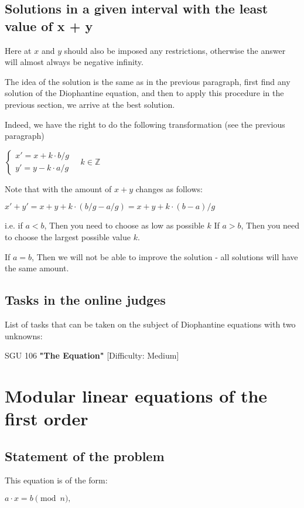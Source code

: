 \subsection{ Solutions in a given interval with the least value of x + y }

Here at $x$ and $y$ should also be imposed any restrictions, otherwise the answer will almost always be negative infinity.

The idea of ​​the solution is the same as in the previous paragraph, first find any solution of the Diophantine equation, and then to apply this procedure in the previous section, we arrive at the best solution.

Indeed, we have the right to do the following transformation (see the previous paragraph)

$\begin{cases}
x'=x+k\cdot b/g\\
y'=y-k\cdot a/g
\end{cases}\quad k\in\mathbb{Z}$

Note that with the amount of $x + y$ changes as follows:

$x'+y'=x+y+k\cdot(b/g-a/g)=x+y+k\cdot(b-a)/g$

i.e. if $a <b$, Then you need to choose as low as possible $k$ If $a> b$, Then you need to choose the largest possible value $k$.

If $a = b$, Then we will not be able to improve the solution - all solutions will have the same amount.

\subsection{ Tasks in the online judges }

List of tasks that can be taken on the subject of Diophantine equations with two unknowns:

SGU 106 \textbf{"The Equation"} [Difficulty: Medium]

\section{ Modular linear equations of the first order }
\subsection{ Statement of the problem }

This equation is of the form:

$a \cdot x = b \pmod n,$

